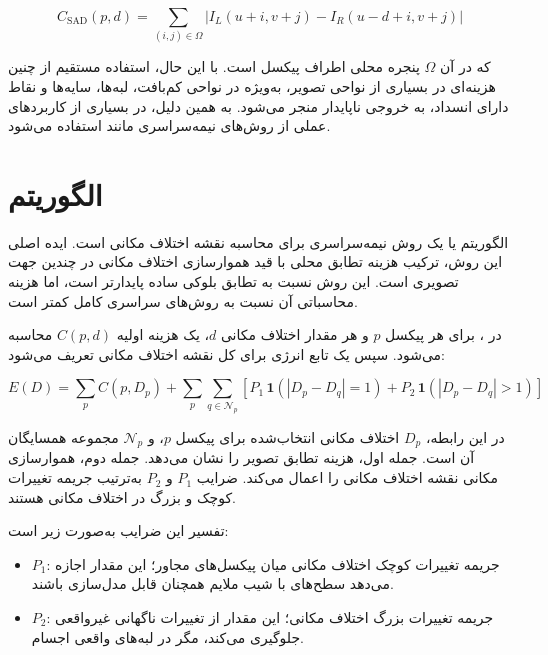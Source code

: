 \begin{equation}
	C_{\mathrm{SAD}}(p,d)
	=
	\sum_{(i,j)\in \Omega}
	\left|
	I_L(u+i,v+j)
	-
	I_R(u-d+i,v+j)
	\right|
	\label{eq:sad_cost}
\end{equation}

که در آن \(\Omega\) پنجره محلی اطراف پیکسل است. با این حال، استفاده مستقیم از چنین هزینه‌ای در بسیاری از نواحی تصویر، به‌ویژه در نواحی کم‌بافت، لبه‌ها، سایه‌ها و نقاط دارای انسداد، به خروجی ناپایدار منجر می‌شود. به همین دلیل، در بسیاری از کاربردهای عملی از روش‌های نیمه‌سراسری مانند  استفاده می‌شود.

\section{الگوریتم }

الگوریتم  یا  یک روش نیمه‌سراسری برای محاسبه نقشه اختلاف مکانی است. ایده اصلی این روش، ترکیب هزینه تطابق محلی با قید هموارسازی اختلاف مکانی در چندین جهت تصویری است. این روش نسبت به تطابق بلوکی ساده پایدارتر است، اما هزینه محاسباتی آن نسبت به روش‌های سراسری کامل کمتر است.

در ، برای هر پیکسل \(p\) و هر مقدار اختلاف مکانی \(d\)، یک هزینه اولیه \(C(p,d)\) محاسبه می‌شود. سپس یک تابع انرژی برای کل نقشه اختلاف مکانی تعریف می‌شود:

\begin{equation}
	E(D)
	=
	\sum_{p}
	C(p,D_p)
	+
	\sum_{p}
	\sum_{q\in \mathcal{N}_p}
	\left[
	P_1 \, \mathbf{1}
	\left(
	|D_p-D_q|=1
	\right)
	+
	P_2 \, \mathbf{1}
	\left(
	|D_p-D_q|>1
	\right)
	\right]
	\label{eq:sgbm_energy}
\end{equation}

در این رابطه، \(D_p\) اختلاف مکانی انتخاب‌شده برای پیکسل \(p\)، و \(\mathcal{N}_p\) مجموعه همسایگان آن است. جمله اول، هزینه تطابق تصویر را نشان می‌دهد. جمله دوم، هموارسازی مکانی نقشه اختلاف مکانی را اعمال می‌کند. ضرایب \(P_1\) و \(P_2\) به‌ترتیب جریمه تغییرات کوچک و بزرگ در اختلاف مکانی هستند.

تفسیر این ضرایب به‌صورت زیر است:

\begin{itemize}
	\item \(P_1\): جریمه تغییرات کوچک اختلاف مکانی میان پیکسل‌های مجاور؛ این مقدار اجازه می‌دهد سطح‌های با شیب ملایم همچنان قابل مدل‌سازی باشند.
	\item \(P_2\): جریمه تغییرات بزرگ اختلاف مکانی؛ این مقدار از تغییرات ناگهانی غیرواقعی جلوگیری می‌کند، مگر در لبه‌های واقعی اجسام.
\end{itemize}

